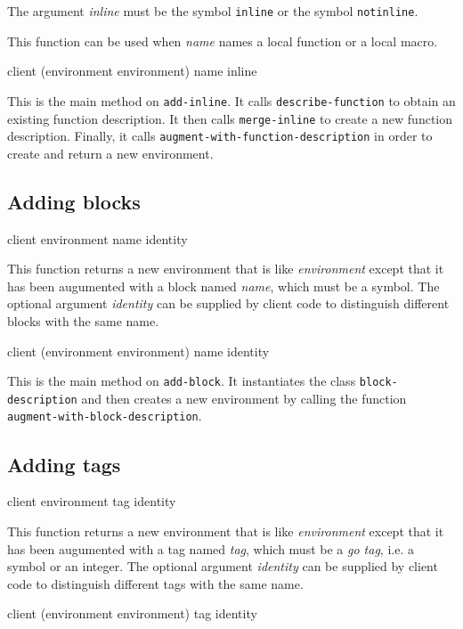 The argument \textit{inline} must be the symbol \texttt{inline} or the
symbol \texttt{notinline}.

This function can be used when \textit{name} names a local function or
a local macro.

{\footnotesize
{}
{client
 (environment environment)
 name
 inline}
}

This is the main method on \texttt{add-inline}.  It calls
\texttt{describe-function} to obtain an existing function description.
It then calls \texttt{merge-inline} to create a new function
description.  Finally, it calls
\texttt{augment-with-function-description} in order to create and
return a new environment.

\subsection{Adding blocks}

{\footnotesize
{} {client environment name \optional identity}
}

This function returns a new environment that is like
\textit{environment} except that it has been augumented with a block
named \textit{name}, which must be a symbol.  The optional argument
\textit{identity} can be supplied by client code to distinguish
different blocks with the same name.

{\footnotesize
{}
{client
 (environment environment)
 name
 \optional identity}
}

This is the main method on \texttt{add-block}.  It instantiates the
class \texttt{block-description} and then creates a new
environment by calling the function
\texttt{augment-with-block-description}.

\subsection{Adding tags}

{\footnotesize
{} {client environment tag \optional identity}
}

This function returns a new environment that is like
\textit{environment} except that it has been augumented with a tag
named \textit{tag}, which must be a \emph{go tag}, i.e. a symbol or an
integer.  The optional argument \textit{identity} can be supplied by
client code to distinguish different tags with the same name.

{\footnotesize
{}
{client
 (environment environment)
 tag
 \optional identity}
}

